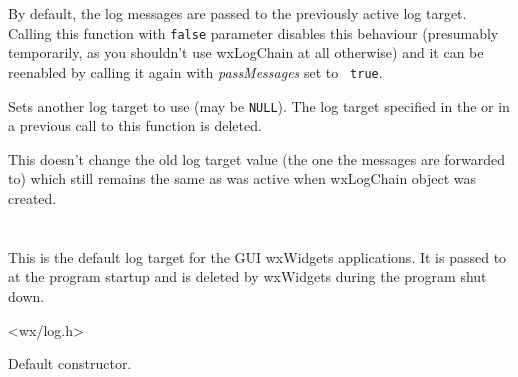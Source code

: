 \label{wxlogchainpassmessages}


By default, the log messages are passed to the previously active log target.
Calling this function with {\tt false} parameter disables this behaviour
(presumably temporarily, as you shouldn't use wxLogChain at all otherwise) and
it can be reenabled by calling it again with {\it passMessages} set to {\tt
true}.

\label{wxlogchainsetlog}


Sets another log target to use (may be {\tt NULL}). The log target specified
in the  or in a previous call to
this function is deleted.

This doesn't change the old log target value (the one the messages are
forwarded to) which still remains the same as was active when wxLogChain
object was created.


\section{}\label{wxloggui}

This is the default log target for the GUI wxWidgets applications. It is passed
to  at the program
startup and is deleted by wxWidgets during the program shut down.




<wx/log.h>


\label{wxlogguictor}


Default constructor.


\section{}\label{wxlognull}

